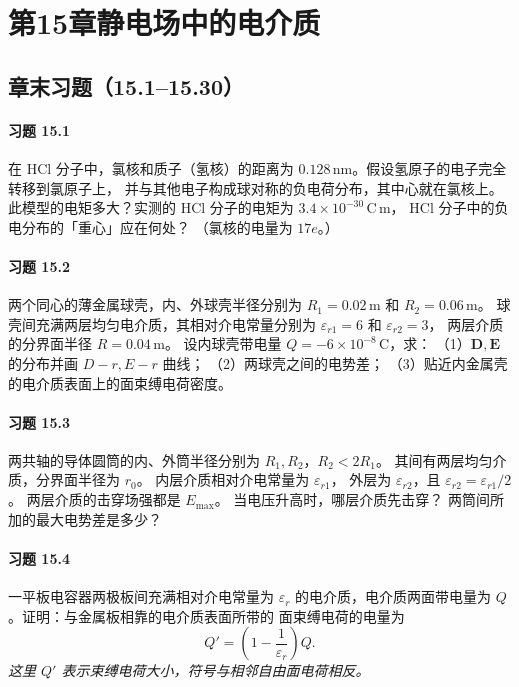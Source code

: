 \section*{第15章\quad 静电场中的电介质}
\subsection*{章末习题（15.1--15.30）}

\paragraph{习题 15.1}
在 \(\mathrm{HCl}\) 分子中，氯核和质子（氢核）的距离为
\(0.128\,\mathrm{nm}\)。假设氢原子的电子完全转移到氯原子上，
并与其他电子构成球对称的负电荷分布，其中心就在氯核上。
此模型的电矩多大？实测的 HCl 分子的电矩为
\(3.4\times10^{-30}\,\mathrm{C\,m}\)，
HCl 分子中的负电分布的「重心」应在何处？
（氯核的电量为 \(17e\)。）

\paragraph{习题 15.2}
两个同心的薄金属球壳，内、外球壳半径分别为
\(R_1=0.02\,\mathrm m\) 和 \(R_2=0.06\,\mathrm m\)。
球壳间充满两层均匀电介质，其相对介电常量分别为
\(\varepsilon_{r1}=6\) 和 \(\varepsilon_{r2}=3\)，
两层介质的分界面半径 \(R=0.04\,\mathrm m\)。
设内球壳带电量 \(Q=-6\times10^{-8}\,\mathrm C\)，求：
（1）\(\boldsymbol D,\boldsymbol E\) 的分布并画 \(D-r,E-r\) 曲线；
（2）两球壳之间的电势差；
（3）贴近内金属壳的电介质表面上的面束缚电荷密度。

\paragraph{习题 15.3}
两共轴的导体圆筒的内、外筒半径分别为
\(R_1,R_2\)，\(R_2<2R_1\)。
其间有两层均匀介质，分界面半径为 \(r_0\)。
内层介质相对介电常量为 \(\varepsilon_{r1}\)，
外层为 \(\varepsilon_{r2}\)，且
\(\varepsilon_{r2}=\varepsilon_{r1}/2\)。
两层介质的击穿场强都是 \(E_{\max}\)。
当电压升高时，哪层介质先击穿？
两筒间所加的最大电势差是多少？

\paragraph{习题 15.4}
一平板电容器两极板间充满相对介电常量为
\(\varepsilon_r\) 的电介质，电介质两面带电量为
\(Q\)。证明：与金属板相靠的电介质表面所带的
面束缚电荷的电量为
\[
 Q'=\left(1-\frac1{\varepsilon_r}\right)Q.
\]
\textit{这里 \(Q'\) 表示束缚电荷大小，符号与相邻自由面电荷相反。}

